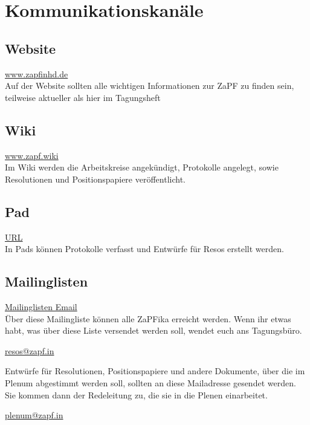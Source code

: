 
\section{Kommunikationskanäle}

\subsection{Website}
\url{www.zapfinhd.de}\\

\noindent Auf der Website sollten alle wichtigen Informationen zur ZaPF zu finden sein, teilweise aktueller als hier im Tagungsheft

\subsection{Wiki}
\url{www.zapf.wiki}\\

\noindent Im Wiki werden die Arbeitskreise angekündigt, Protokolle angelegt, sowie Resolutionen und Positionspapiere veröffentlicht.

\subsection{Pad}
\url{URL}\\ %

\noindent In Pads können Protokolle verfasst und Entwürfe für Resos erstellt werden.

\subsection{Mailinglisten}
\url{Mailinglisten Email}\\ %

\noindent Über diese Mailingliste können alle ZaPFika erreicht werden. Wenn ihr etwas habt, was über diese Liste versendet werden soll, wendet euch ans Tagungsbüro.

\url{resos@zapf.in}

Entwürfe für Resolutionen, Positionspapiere und andere Dokumente, über die im Plenum abgestimmt werden soll, sollten an diese Mailadresse gesendet werden. Sie kommen dann der Redeleitung zu, die sie in die Plenen einarbeitet.

\url{plenum@zapf.in}


